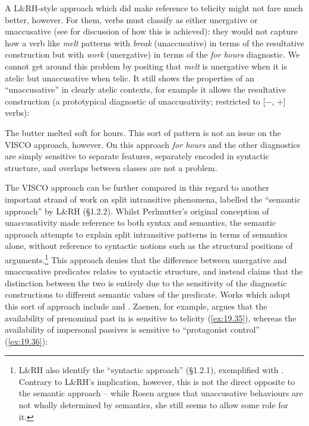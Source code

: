 \documentclass[output=paper]{langsci/langscibook}
\begin{document}
A L\&RH-style approach which did make reference to telicity might not fare
much better, however. For them, verbs must classify as either unergative or
unaccusative (see  for discussion of how this is achieved): they
would not capture how a verb like \emph{melt} patterns with \emph{break}
(unaccusative) in terms of the resultative construction but with \emph{work}
(unergative) in terms of the \emph{for hours} diagnostic. We cannot get
around this problem by positing that \emph{melt} is unergative when it is
atelic but unaccusative when telic. It still shows the properties of an
\enquote{unaccusative} in clearly atelic contexts, for example it allows the
resultative construction (a prototypical diagnostic of unaccusativity;
restricted to [$-$\Initiation{}, $+$\Change{}] verbs):

\ea The butter melted soft for hours.
\z
This sort of pattern is not an issue on the VISCO approach, however. On this
approach \emph{for hours} and the other diagnostics are simply sensitive to
separate features, separately encoded in syntactic structure, and overlaps
between classes are not a problem.

The VISCO approach can be further compared in this regard to another important
strand of work on split intransitive phenomena, labelled the
\enquote{semantic approach} by L\&RH (§1.2.2). Whilst Perlmutter’s original
conception of unaccusativity made reference to both syntax and semantics, the
semantic approach attempts to explain split intransitive patterns in terms of
semantics alone, without reference to syntactic notions such as the structural
positions of arguments.\footnote{L\&RH also identify the \enquote{syntactic
approach} (§1.2.1), exemplified with \citet{Rosen1984}. Contrary to L\&RH’s
implication, however, this is not the direct opposite to the semantic approach
– while Rosen argues that unaccusative behaviours are not wholly determined by
semantics, she still seems to allow some role for it.}  This approach denies
that the difference between unergative and unaccusative predicates relates to
syntactic structure, and instead claims that the distinction between the two is
entirely due to the sensitivity of the diagnostic constructions to different
semantic values of the predicate. Works which adopt this sort of approach
include \citet{Valin1990} and \citet{Zaenen1993}. Zaenen, for example,
argues that the availability of prenominal past  in
 is sensitive to telicity (\ref{ex:19.35}), whereas the availability
of impersonal passives is sensitive to \enquote{protagonist control}
(\ref{ex:19.36}):
\end{document}

